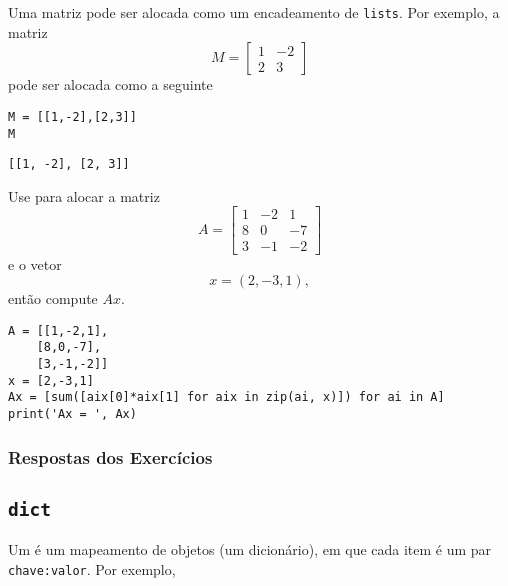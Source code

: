 \begin{exer}
  Uma matriz pode ser alocada como um encadeamento de \texttt{lists}. Por exemplo, a matriz
  \begin{equation}
    M =
    \begin{bmatrix}
      1 & -2 \\
      2 & 3
    \end{bmatrix}
  \end{equation}
  pode ser alocada como a seguinte {\PYTHONlist}

\begin{lstlisting}
M = [[1,-2],[2,3]]
M
\end{lstlisting}

\begin{verbatim}
[[1, -2], [2, 3]]
\end{verbatim}

  Use {\PYTHONlist} para alocar a matriz
  \begin{equation}
    A =
    \begin{bmatrix}
      1 & -2 & 1\\
      8 & 0 & -7\\
      3 & -1 & -2
    \end{bmatrix}
  \end{equation}
  e o vetor
  \begin{equation}
    x = (2, -3, 1),
  \end{equation}
  então compute $Ax$.
\end{exer}
\begin{resp}

\begin{lstlisting}
A = [[1,-2,1],
    [8,0,-7],
    [3,-1,-2]]
x = [2,-3,1]
Ax = [sum([aix[0]*aix[1] for aix in zip(ai, x)]) for ai in A]
print('Ax = ', Ax)
\end{lstlisting}

\end{resp}

\ifisbook 
\subsubsection*{Respostas dos Exercícios}
\shipoutAnswer
\fi


\subsection{\texttt{dict}}

Um {\PYTHONdict} é um mapeamento de objetos (um dicionário), em que cada item é um par \texttt{chave:valor}. Por exemplo,

